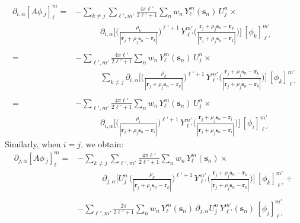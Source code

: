 \documentclass[12pt,letterpaper,oneside]{article}
\theoremstyle{definition}
\begin{document}
\begin{align*}
\partial_{i,\alpha} [A \phi\,_j]_\ell^m = & -\sum_{k\ne j}\sum_{\ell',m'}  \frac{4 \pi \ell'}{2 \ell'+1} \sum_n w_n \, Y_\ell^m(\boldsymbol{s}_n) \, U_j^n \times \\
& \qquad \quad \partial_{i,\alpha} \bigg[ \bigg( \frac{\rho_k}{| \boldsymbol{r}_j + \rho_j \boldsymbol{s}_n - \boldsymbol{r}_k |} \bigg)^{\ell'+1} \, Y_{\ell'}^{m'} \bigg( \frac{\boldsymbol{r}_j + \rho_j \boldsymbol{s}_n - \boldsymbol{r}_k}{| \boldsymbol{r}_j + \rho_j \boldsymbol{s}_n - \boldsymbol{r}_k |} \bigg) \bigg] \, [\phi_k]_{\ell '}^{m '} \\ \\
= & -\sum_{\ell',m'}  \frac{4 \pi \ell'}{2 \ell'+1} \sum_n w_n \, Y_\ell^m(\boldsymbol{s}_n) \, U_j^n \times \\
& \qquad \quad \sum_{k\ne j} \partial_{i,\alpha} \bigg[ \bigg( \frac{\rho_k}{| \boldsymbol{r}_j + \rho_j \boldsymbol{s}_n - \boldsymbol{r}_k |} \bigg)^{\ell'+1} \, Y_{\ell'}^{m'} \bigg( \frac{\boldsymbol{r}_j + \rho_j \boldsymbol{s}_n - \boldsymbol{r}_k}{| \boldsymbol{r}_j + \rho_j \boldsymbol{s}_n - \boldsymbol{r}_k |} \bigg) \bigg] \, [\phi_k]_{\ell '}^{m '} \\ \\
= & -\sum_{\ell',m'}  \frac{4 \pi \ell'}{2 \ell'+1} \sum_n w_n \, Y_\ell^m(\boldsymbol{s}_n) \, U_j^n \times \\
& \qquad \quad \partial_{i,\alpha} \bigg[ \bigg( \frac{\rho_i}{| \boldsymbol{r}_j + \rho_j \boldsymbol{s}_n - \boldsymbol{r}_i |} \bigg)^{\ell'+1} \, Y_{\ell'}^{m'} \bigg( \frac{\boldsymbol{r}_j + \rho_j \boldsymbol{s}_n - \boldsymbol{r}_i}{| \boldsymbol{r}_j + \rho_j \boldsymbol{s}_n - \boldsymbol{r}_i |} \bigg) \bigg] \, [\phi_i]_{\ell '}^{m '}
\end{align*}
Similarly, when $i = j$, we obtain:
\begin{align*}
\partial_{j,\alpha} [A \phi \,_j]_\ell^m  = & - \sum_{k\ne j} \sum_{\ell',m'}\frac{4 \pi \ell'}{2 \ell'+1} \sum_n w_n \, Y_\ell^m(\boldsymbol{s}_n) \times \\
& \qquad \quad \partial_{j,\alpha} \bigg[ U_j^n  \, \bigg( \frac{\rho_k}{|\boldsymbol{r}_j + \rho_j \boldsymbol{s}_n - \boldsymbol{r}_k|} \bigg)^{\ell'+1} \, Y_{\ell'}^{m'} \bigg( \frac{\boldsymbol{r}_j + \rho_j \boldsymbol{s}_n - \boldsymbol{r}_k}{|\boldsymbol{r}_j + \rho_j \boldsymbol{s}_n - \boldsymbol{r}_k |} \bigg) \bigg] \,  [\phi_k]_{\ell'}^{m'} +  \\  \\
& - \sum_{\ell',m'} \frac{2\pi}{2 \ell'+1}  \sum_n w_n \, Y_\ell^m(\boldsymbol{s}_n) \, \partial_{j,\alpha} U_j^n \, Y_{\ell'}^{m'}(\boldsymbol{s}_n) \, [\phi_j]_{\ell '}^{m '} 
\end{align*}
\end{document}
